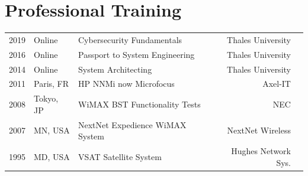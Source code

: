 \documentclass[espanol]{cv-style}     %
\begin{document}
\section{Professional Training}
\vspace{-0.2cm}
\begin{tabular}{ p{5em} p{6em} p{20em} rp{6em}}
2019 & Online & Cybersecurity Fundamentals & Thales University\\
2016 & Online & Passport to System Engineering & Thales University\\
2014 & Online & System Architecting & Thales University\\
2011 & Paris, FR & HP NNMi now Microfocus & Axel-IT\\
2008 & Tokyo, JP & WiMAX BST Functionality Tests & NEC\\
2007 & MN, USA & NextNet Expedience WiMAX System & NextNet Wireless\\
1995 & MD, USA & VSAT Satellite System & Hughes Network Sys.\\
\end{tabular}
\end{document}
